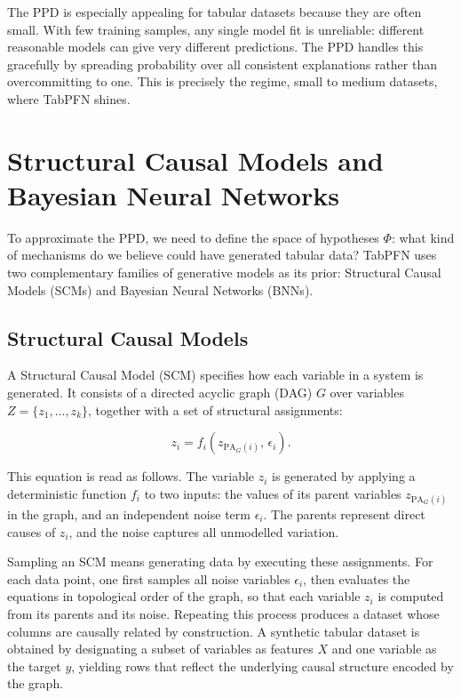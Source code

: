\documentclass[12pt]{article}
\begin{document}
The PPD is especially appealing for tabular datasets because they are often small. With few training samples, any single model fit is unreliable: different reasonable models can give very different predictions. The PPD handles this gracefully by spreading probability over all consistent explanations rather than overcommitting to one. This is precisely the regime,  small to medium datasets,  where TabPFN shines.

\section{Structural Causal Models and Bayesian Neural Networks}

To approximate the PPD, we need to define the space of hypotheses $\Phi$: what kind of mechanisms do we believe could have generated tabular data? TabPFN uses two complementary families of generative models as its prior: Structural Causal Models (SCMs) and Bayesian Neural Networks (BNNs).

\subsection{Structural Causal Models}

A Structural Causal Model (SCM) \cite{pearl2009causality} specifies how each variable in a system is generated. It consists of a directed acyclic graph (DAG) $G$ over variables $Z = \{z_1, \ldots, z_k\}$, together with a set of structural assignments:

\[
z_i = f_i\!\left(z_{\text{PA}_G(i)},\, \epsilon_i\right).
\]

This equation is read as follows. The variable $z_i$ is generated by applying a deterministic function $f_i$ to two inputs: the values of its parent variables $z_{\text{PA}_G(i)}$ in the graph, and an independent noise term $\epsilon_i$. The parents represent direct causes of $z_i$, and the noise captures all unmodelled variation.

Sampling an SCM means generating data by executing these assignments. For each data point, one first samples all noise variables $\epsilon_i$, then evaluates the equations in topological order of the graph, so that each variable $z_i$ is computed from its parents and its noise. Repeating this process produces a dataset whose columns are causally related by construction. A synthetic tabular dataset is obtained by designating a subset of variables as features $X$ and one variable as the target $y$, yielding rows that reflect the underlying causal structure encoded by the graph.
\end{document}
